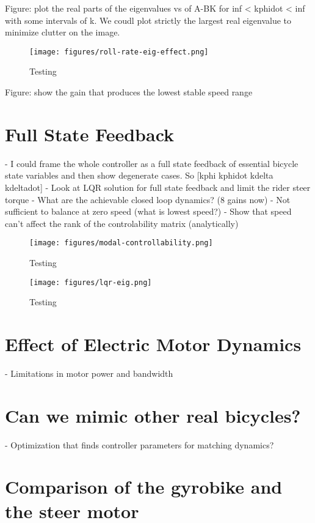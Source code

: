 \documentclass[12pt]{article}
\begin{document}
Figure: plot the real parts of the eigenvalues vs of A-BK for inf < kphidot <
inf with some intervals of k. We coudl plot strictly the largest real
eigenvalue to minimize clutter on the image.

\begin{figure}
  \centering
  \texttt{[image: figures/roll-rate-eig-effect.png]}
  \caption{Testing}
  \label{fig:roll-rate-eig-effect}
\end{figure}

Figure: show the gain that produces the lowest stable speed range

\section{Full State Feedback}

- I could frame the whole controller as a full state feedback of essential
bicycle state variables and then show degenerate cases. So [kphi kphidot kdelta
kdeltadot]
- Look at LQR solution for full state feedback and limit the rider steer torque
- What are the achievable closed loop dynamics? (8 gains now)
- Not sufficient to balance at zero speed (what is lowest speed?)
- Show that speed can't affect the rank of the controlability matrix
(analytically)

\begin{figure}
  \centering
  \texttt{[image: figures/modal-controllability.png]}
  \caption{Testing}
  \label{fig:modal-controllability}
\end{figure}

\begin{figure}
  \centering
  \texttt{[image: figures/lqr-eig.png]}
  \caption{Testing}
  \label{fig:lqr-eig}
\end{figure}

\section{Effect of Electric Motor Dynamics}

- Limitations in motor power and bandwidth

\section{Can we mimic other real bicycles?}

- Optimization that finds controller parameters for matching dynamics?

\section{Comparison of the gyrobike and the steer motor}
\end{document}

